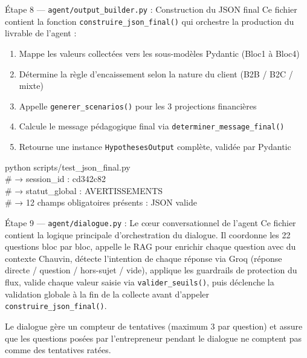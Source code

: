 \documentclass[12pt, a4paper]{report}
\begin{document}
\bigskip

\begin{stepbox}{Étape 8 — \texttt{agent/output\_builder.py} : Construction du JSON final}
Ce fichier contient la fonction \texttt{construire\_json\_final()} qui orchestre la production du livrable de l'agent :

\begin{enumerate}
  \item Mappe les valeurs collectées vers les sous-modèles Pydantic (Bloc1 à Bloc4)
  \item Détermine la règle d'encaissement selon la nature du client (B2B / B2C / mixte)
  \item Appelle \texttt{generer\_scenarios()} pour les 3 projections financières
  \item Calcule le message pédagogique final via \texttt{determiner\_message\_final()}
  \item Retourne une instance \texttt{HypothesesOutput} complète, validée par Pydantic
\end{enumerate}

\begin{codebox}
python scripts/test\_json\_final.py\\
\# → session\_id : cd342c82\\
\# → statut\_global : AVERTISSEMENTS\\
\# → 12 champs obligatoires présents : \checkmark{} JSON valide
\end{codebox}
\end{stepbox}

\bigskip

\begin{stepbox}{Étape 9 — \texttt{agent/dialogue.py} : Le cœur conversationnel de l'agent}
Ce fichier contient la logique principale d'orchestration du dialogue. Il coordonne les 22 questions bloc par bloc, appelle le RAG pour enrichir chaque question avec du contexte Chauvin, détecte l'intention de chaque réponse via Groq (réponse directe / question / hors-sujet / vide), applique les guardrails de protection du flux, valide chaque valeur saisie via \texttt{valider\_seuils()}, puis déclenche la validation globale à la fin de la collecte avant d'appeler \texttt{construire\_json\_final()}.

Le dialogue gère un compteur de tentatives (maximum 3 par question) et assure que les questions posées par l'entrepreneur pendant le dialogue ne comptent pas comme des tentatives ratées.
\end{stepbox}
\end{document}
